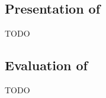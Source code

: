 \subsection[Presentation of Ntoutsi et al. (2020)]{Presentation of \textcite{Ntoutsi_2020}}
TODO

\subsection[Evaluation of Ntoutsi et al. (2020)]{Evaluation of \textcite{Ntoutsi_2020}}
TODO